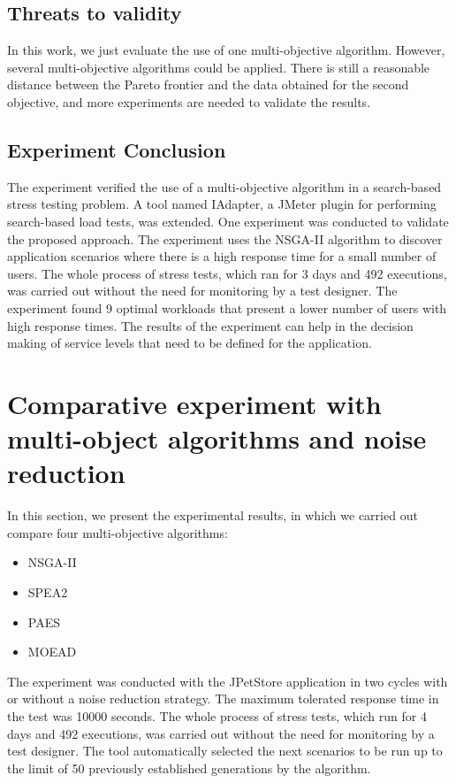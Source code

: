 \documentclass{report}
\begin{document}
\subsection{Threats to validity}

In this work, we just evaluate the use of one multi-objective algorithm. However, several multi-objective algorithms could be applied.  There is still a reasonable distance between the Pareto frontier and the data obtained for the second objective, and more experiments are needed to validate the results.

\subsection{Experiment Conclusion}


The experiment verified the use of a multi-objective algorithm in a search-based stress testing problem. A tool named IAdapter, a JMeter plugin for performing search-based load tests, was extended.  One experiment was conducted to validate the proposed approach. The experiment uses the NSGA-II algorithm to discover application scenarios where there is a high response time for a small number of users. The whole process of stress  tests, which ran for 3 days and 492 executions, was carried out without the need for monitoring by a test designer.  The experiment found 9 optimal workloads that present a lower number of users with high response times. The results of the experiment can help in the decision making of service levels that need to be defined for the application.

\section{Comparative experiment with multi-object algorithms and noise reduction}


In this section,  we present the experimental results,  in which we carried out compare four multi-objective algorithms:

\begin{itemize}
\item NSGA-II
\item SPEA2
\item PAES
\item MOEAD
\end{itemize}

The experiment was conducted with the JPetStore application in two cycles with or without a noise reduction strategy. The maximum tolerated response time in the test was 10000 seconds.  The whole process of stress  tests, which run for 4 days and 492 executions, was carried out without the need for monitoring by a test designer. The tool automatically selected the next scenarios to be run up to the limit of 50 previously established  generations by the algorithm. 
\end{document}
